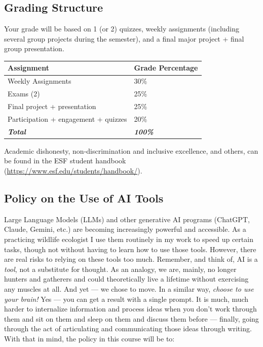 \documentclass[
  letterpaper,
  DIV=11,
  numbers=noendperiod]{scrartcl}
\newcounter{none} %
\begin{document}
\subsection{Grading Structure}\label{grading-structure}

Your grade will be based on 1 (or 2) quizzes, weekly assignments
(including several group projects during the semester), and a final
major project + final group presentation.

{\def\LTcaptype{none} %
\begin{longtable}[]{@{}ll@{}}
\toprule\noalign{}
Assignment & Grade Percentage \\
\midrule\noalign{}
\endhead
\bottomrule\noalign{}
\endlastfoot
Weekly Assignments & 30\% \\
Exams (2) & 25\% \\
Final project + presentation & 25\% \\
Participation + engagement + quizzes & 20\% \\
\textbf{\emph{Total}} & \textbf{\emph{100\%}} \\
\end{longtable}
}

Academic dishonesty, non-discrimination and inclusive excellence, and
others, can be found in the ESF student handbook
(\url{https://www.esf.edu/students/handbook/}).

\subsection{Policy on the Use of AI
Tools}\label{policy-on-the-use-of-ai-tools}

Large Language Models (LLMs) and other generative AI programs (ChatGPT,
Claude, Gemini, etc.) are becoming increasingly powerful and accessible.
As a practicing wildlife ecologist I use them routinely in my work to
speed up certain tasks, though not without having to learn how to use
those tools. However, there are real risks to relying on these tools too
much. Remember, and think of, AI is a \emph{tool}, not a substitute for
thought. As an analogy, we are, mainly, no longer hunters and gatherers
and could theoretically live a lifetime without exercising any muscles
at all. And yet --- we chose to move. In a similar way, \emph{choose to
use your brain!} Yes --- you can get a result with a single prompt. It
is much, much harder to internalize information and process ideas when
you don't work through them and sit on them and sleep on them and
discuss them before --- finally, going through the act of articulating
and communicating those ideas through writing. With that in mind, the
policy in this course will be to:
\end{document}
